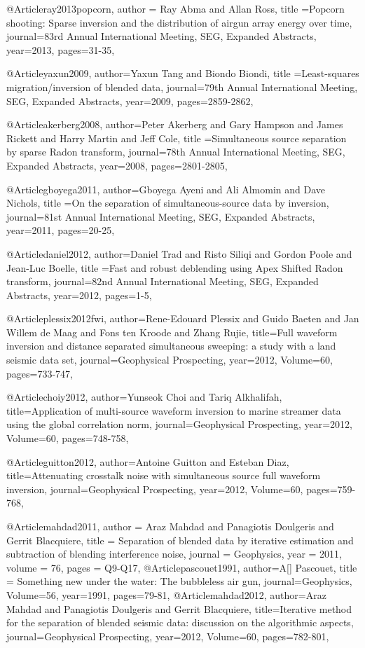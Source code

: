 {@Article{ray2013popcorn,
  author = {Ray Abma and Allan Ross},
  title ={Popcorn shooting: Sparse inversion and the distribution of airgun array energy over time},
  journal={83rd Annual International Meeting, SEG, Expanded Abstracts},
  year=2013,
  pages={31-35},
}

@Article{yaxun2009,
  author={Yaxun Tang and Biondo Biondi},
  title ={Least-squares migration/inversion of blended data},
  journal={79th Annual International Meeting, SEG, Expanded Abstracts},
  year=2009,
  pages={2859-2862},
}

@Article{akerberg2008,
  author={Peter Akerberg and Gary Hampson and James Rickett and Harry Martin and Jeff Cole},
  title ={Simultaneous source separation by sparse Radon transform},
  journal={78th Annual International Meeting, SEG, Expanded Abstracts},
  year=2008,
  pages={2801-2805},
}

@Article{gboyega2011,
  author={Gboyega Ayeni and Ali Almomin and Dave Nichols},
  title ={On the separation of simultaneous-source data by inversion},
  journal={81st Annual International Meeting, SEG, Expanded Abstracts},
  year=2011,
  pages={20-25},
}

@Article{daniel2012,
  author={Daniel Trad and Risto Siliqi and Gordon Poole and Jean-Luc Boelle},
  title ={Fast and robust deblending using Apex Shifted Radon transform},
  journal={82nd Annual International Meeting, SEG, Expanded Abstracts},
  year=2012,
  pages={1-5},
}

@Article{plessix2012fwi,
  author={Rene-Edouard Plessix and Guido Baeten and Jan Willem de Maag and Fons ten Kroode and Zhang Rujie},
  title={Full waveform inversion and distance separated simultaneous sweeping: a study with a land seismic data set},
  journal={Geophysical Prospecting},
  year=2012,
  Volume=60,
  pages={733-747},
}

@Article{choiy2012,
  author={Yunseok Choi and Tariq Alkhalifah},
  title={Application of multi-source waveform inversion to marine streamer data using the global correlation norm},
  journal={Geophysical Prospecting},
  year=2012,
  Volume=60,
  pages={748-758},
}


@Article{guitton2012,
  author={Antoine Guitton and Esteban Diaz},
  title={Attenuating crosstalk noise with simultaneous source full waveform inversion},
  journal={Geophysical Prospecting},
  year=2012,
  Volume=60,
  pages={759-768},
}

@Article{mahdad2011,
  author = 	 {Araz Mahdad and Panagiotis Doulgeris and Gerrit Blacquiere},
  title = 	 {Separation of blended data by iterative estimation and subtraction of blending interference noise},
  journal = 	 {Geophysics},
  year = 	 2011,
  volume =	 76,
  pages =	 {Q9-Q17},
}
@Article{pascouet1991,
  author={A[] Pascouet},
  title = {Something new under the water: The bubbleless air gun},
  journal={Geophysics},
  Volume=56,
  year=1991,
  pages={79-81},
}
@Article{mahdad2012,
  author={Araz Mahdad and Panagiotis Doulgeris and Gerrit Blacquiere},
  title={Iterative method for the separation of blended seismic data: discussion on the algorithmic aspects},
  journal={Geophysical Prospecting},
  year=2012,
  Volume=60,
  pages={782-801},
}



}

